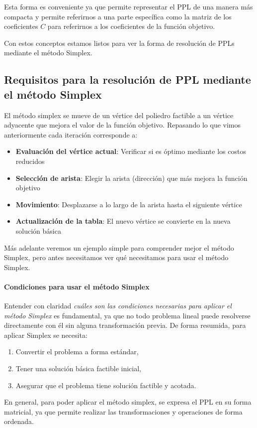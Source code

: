 Esta forma es conveniente ya que permite representar el PPL de una manera más compacta y permite referirnos a una parte específica como la matriz de los coeficientes \(C\) para referirnos a los coeficientes de la función objetivo.

Con estos conceptos estamos listos para ver la forma de resolución de PPLs mediante el método Simplex.

\subsection{Requisitos para la resolución de PPL mediante el método Simplex}

El método simplex se mueve de un vértice del poliedro factible a un vértice adyacente que mejora el valor de la función objetivo. Repasando lo que vimos anteriormente cada iteración corresponde a:
\begin{itemize}
  \item \textbf{Evaluación del vértice actual}: Verificar si es óptimo mediante los costos reducidos
  \item \textbf{Selección de arista}: Elegir la arista (dirección) que más mejora la función objetivo
  \item \textbf{Movimiento}: Desplazarse a lo largo de la arista hasta el siguiente vértice
  \item \textbf{Actualización de la tabla}: El nuevo vértice se convierte en la nueva solución básica
\end{itemize}
Más adelante veremos un ejemplo simple para comprender mejor el método Simplex, pero antes necesitamos ver qué necesitamos para usar el método Simplex.

\paragraph{Condiciones para usar el método Simplex}

Entender con claridad \textit{cuáles son las condiciones necesarias para aplicar el método Simplex} es fundamental, ya que no todo problema lineal puede resolverse directamente con él sin alguna transformación previa. De forma resumida, para aplicar Simplex se necesita:
\begin{enumerate}
  \item Convertir el problema a forma estándar,
  \item Tener una solución básica factible inicial,
  \item Asegurar que el problema tiene solución factible y acotada.
\end{enumerate}
En general, para poder aplicar el método simplex, se expresa el PPL en su forma matricial, ya que permite realizar las transformaciones y operaciones de forma ordenada.


